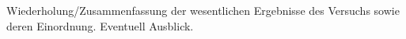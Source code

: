 Wiederholung/Zusammenfassung der wesentlichen Ergebnisse des Versuchs sowie deren Einordnung. Eventuell Ausblick.
